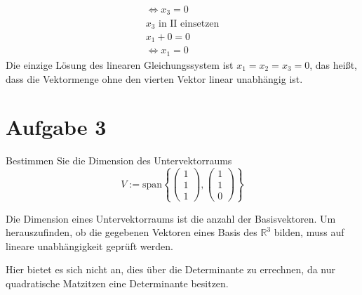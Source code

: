 \begin{align*}
    \Leftrightarrow x_3 = 0                                                                                                                                                     \\
    x_3 \text{ in II einsetzen}                                                                                                                                                 \\
    x_1 + 0 = 0                                                                                                                                                                 \\
    \Leftrightarrow x_1 = 0
\end{align*}
Die einzige Lösung des linearen Gleichungssystem ist $x_1 = x_2 = x_3 = 0$, das heißt, dass die Vektormenge ohne den vierten Vektor linear unabhängig ist.

\hrulefill{}
\section{Aufgabe 3}
Bestimmen Sie die Dimension des Untervektorraums
\[ V := \text{span}\left\{ \begin{pmatrix} 1 \\ 1 \\ 1 \end{pmatrix}, \begin{pmatrix} 1 \\ 1 \\ 0 \end{pmatrix} \right\} \]

Die Dimension eines Untervektorraums ist die anzahl der Basisvektoren. Um
herauszufinden, ob die gegebenen Vektoren eines Basis des $\mathbb{R}^3$
bilden, muss auf lineare unabhängigkeit geprüft werden.

Hier bietet es sich nicht an, dies über die Determinante zu errechnen, da nur
quadratische Matzitzen eine Determinante besitzen.

